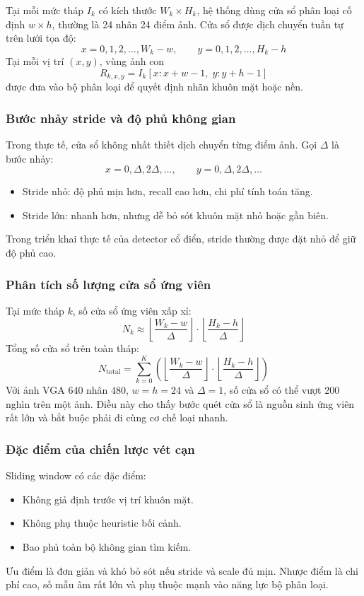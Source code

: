 Tại mỗi mức tháp $I_k$ có kích thước $W_k \times H_k$, hệ thống dùng cửa sổ phân loại cố định $w \times h$, thường là 24 nhân 24 điểm ảnh.
Cửa sổ được dịch chuyển tuần tự trên lưới tọa độ:
\[
x=0,1,2,\ldots, W_k-w,\qquad
y=0,1,2,\ldots, H_k-h
\]
Tại mỗi vị trí $(x,y)$, vùng ảnh con
\[
R_{k,x,y}=I_k[x:x+w-1,\;y:y+h-1]
\]
được đưa vào bộ phân loại để quyết định nhãn khuôn mặt hoặc nền.

\subsubsection{Bước nhảy stride và độ phủ không gian}

Trong thực tế, cửa sổ không nhất thiết dịch chuyển từng điểm ảnh.
Gọi $\Delta$ là bước nhảy:
\[
x=0,\Delta,2\Delta,\ldots,\qquad
y=0,\Delta,2\Delta,\ldots
\]
\begin{itemize}
  \item Stride nhỏ: độ phủ mịn hơn, recall cao hơn, chi phí tính toán tăng.
  \item Stride lớn: nhanh hơn, nhưng dễ bỏ sót khuôn mặt nhỏ hoặc gần biên.
\end{itemize}
Trong triển khai thực tế của detector cổ điển, stride thường được đặt nhỏ để giữ độ phủ cao.

\subsubsection{Phân tích số lượng cửa sổ ứng viên}

Tại mức tháp $k$, số cửa sổ ứng viên xấp xỉ:
\[
N_k \approx
\left\lfloor\frac{W_k-w}{\Delta}\right\rfloor
\cdot
\left\lfloor\frac{H_k-h}{\Delta}\right\rfloor
\]
Tổng số cửa sổ trên toàn tháp:
\[
N_{\text{total}}=
\sum_{k=0}^{K}
\left(
\left\lfloor\frac{W_k-w}{\Delta}\right\rfloor
\cdot
\left\lfloor\frac{H_k-h}{\Delta}\right\rfloor
\right)
\]
Với ảnh VGA 640 nhân 480, $w=h=24$ và $\Delta=1$, số cửa sổ có thể vượt 200 nghìn trên một ảnh.
Điều này cho thấy bước quét cửa sổ là nguồn sinh ứng viên rất lớn và bắt buộc phải đi cùng cơ chế loại nhanh.  \cite{li2012facechapter}

\subsubsection{Đặc điểm của chiến lược vét cạn}

Sliding window có các đặc điểm:
\begin{itemize}
  \item Không giả định trước vị trí khuôn mặt.
  \item Không phụ thuộc heuristic bối cảnh.
  \item Bao phủ toàn bộ không gian tìm kiếm.
\end{itemize}
Ưu điểm là đơn giản và khó bỏ sót nếu stride và scale đủ mịn.
Nhược điểm là chi phí cao, số mẫu âm rất lớn và phụ thuộc mạnh vào năng lực bộ phân loại.

